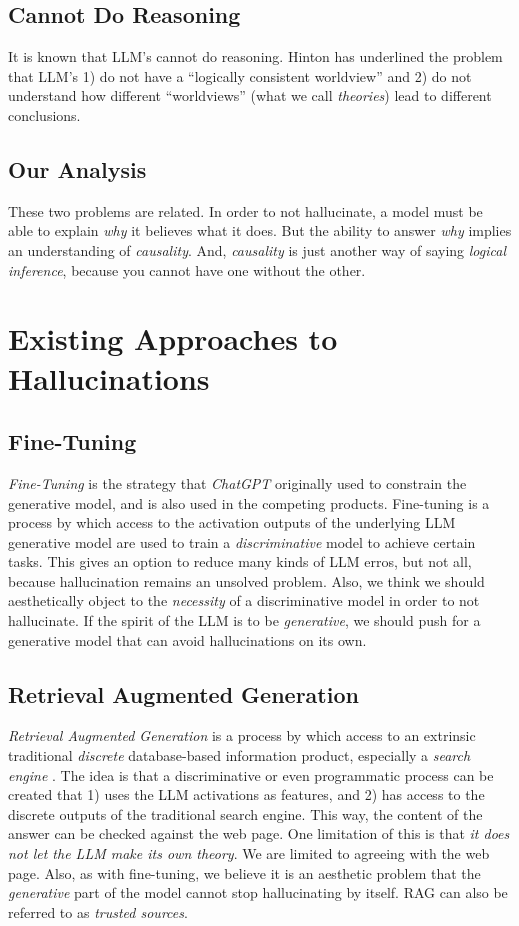 \documentclass[12pt]{article}
\begin{document}
\subsection{Cannot Do Reasoning}
It is known that LLM's cannot do reasoning.
Hinton \cite{hinton:cbs:2023} has underlined the problem that LLM's 1) do not have a ``logically consistent worldview'' and 2) do not understand how different ``worldviews'' (what we call {\em theories}) lead to different conclusions.
\subsection{Our Analysis}
These two problems are related.
In order to not hallucinate, a model must be able to explain {\em why} it believes what it does.
But the ability to answer {\em why} implies an understanding of {\em causality}.
And, {\em causality} is just another way of saying {\em logical inference}, because you cannot have one without the other.
\section{Existing Approaches to Hallucinations}
\subsection{Fine-Tuning}
{\em Fine-Tuning} is the strategy that {\em ChatGPT} originally used to constrain the generative model\cite{radford2018improving,radford2019language,brown2020language},
and is also used in the competing products.
Fine-tuning is a process by which access to the activation outputs of the underlying LLM generative model are used
to train a {\em discriminative} model to achieve certain tasks.
This gives an option to reduce many kinds of LLM erros, but not all, because hallucination remains an unsolved problem.
Also, we think we should aesthetically object to the {\em necessity} of a discriminative model in order to not hallucinate.
If the spirit of the LLM is to be {\em generative}, we should push for a generative model that can avoid hallucinations on its own.
\subsection{Retrieval Augmented Generation}
{\em Retrieval Augmented Generation} is a process by which access to an extrinsic traditional {\em discrete} database-based information
product, especially a {\em search engine} \cite{lewis:2020}.
The idea is that a discriminative or even programmatic process can be created that 1) uses the LLM activations as features, and 2) has access to the discrete outputs of the traditional search engine.
This way, the content of the answer can be checked against the web page.
One limitation of this is that {\em it does not let the LLM make its own theory}.
We are limited to agreeing with the web page.
Also, as with fine-tuning, we believe it is an aesthetic problem that the {\em generative} part of the model cannot stop hallucinating by itself.
RAG can also be referred to as {\em trusted sources}.
\end{document}
